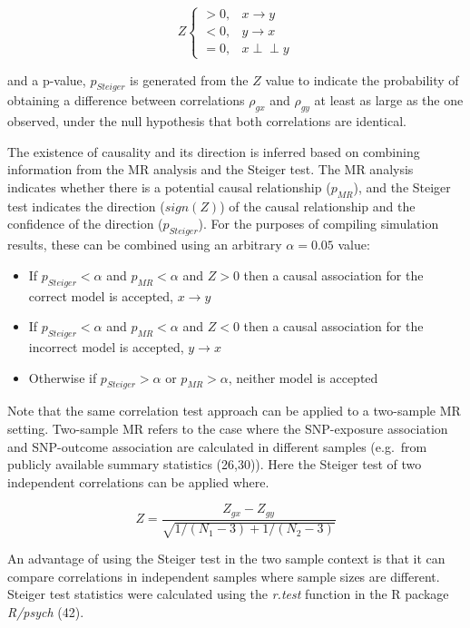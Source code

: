 \documentclass[]{article}
\providecommand{\tightlist}{%
  \setlength{\itemsep}{0pt}\setlength{\parskip}{0pt}}
\begin{document}
\[
Z \left\{
\begin{array}{ll}
> 0, & x \to y\\
< 0, & y \to x\\
= 0, & x \perp\!\!\!\perp y 
\end{array} \right.
\]

and a p-value, \(p_{Steiger}\) is generated from the \(Z\) value to
indicate the probability of obtaining a difference between correlations
\(\rho_{gx}\) and \(\rho_{gy}\) at least as large as the one observed,
under the null hypothesis that both correlations are identical.

The existence of causality and its direction is inferred based on
combining information from the MR analysis and the Steiger test. The MR
analysis indicates whether there is a potential causal relationship
(\(p_{MR}\)), and the Steiger test indicates the direction (\(sign(Z)\))
of the causal relationship and the confidence of the direction
(\(p_{Steiger}\)). For the purposes of compiling simulation results,
these can be combined using an arbitrary \(\alpha = 0.05\) value:

\begin{itemize}
\tightlist
\item
  If \(p_{Steiger} < \alpha\) and \(p_{MR} < \alpha\) and \(Z > 0\) then
  a causal association for the correct model is accepted,
  \(x \rightarrow y\)
\item
  If \(p_{Steiger} < \alpha\) and \(p_{MR} < \alpha\) and \(Z < 0\) then
  a causal association for the incorrect model is accepted,
  \(y \rightarrow x\)
\item
  Otherwise if \(p_{Steiger} > \alpha\) or \(p_{MR} > \alpha\), neither
  model is accepted
\end{itemize}

Note that the same correlation test approach can be applied to a
two-sample MR setting. Two-sample MR refers to the case where the
SNP-exposure association and SNP-outcome association are calculated in
different samples (e.g.~from publicly available summary statistics
(26,30)). Here the Steiger test of two independent correlations can be
applied where.

\[
Z = \frac{Z_{gx} - Z_{gy}} { \sqrt{ 1 / (N_{1} - 3) + 1 / (N_{2} - 3) } }
\]

An advantage of using the Steiger test in the two sample context is that
it can compare correlations in independent samples where sample sizes
are different. Steiger test statistics were calculated using the
\emph{r.test} function in the R package \emph{R/psych} (42).
\end{document}
